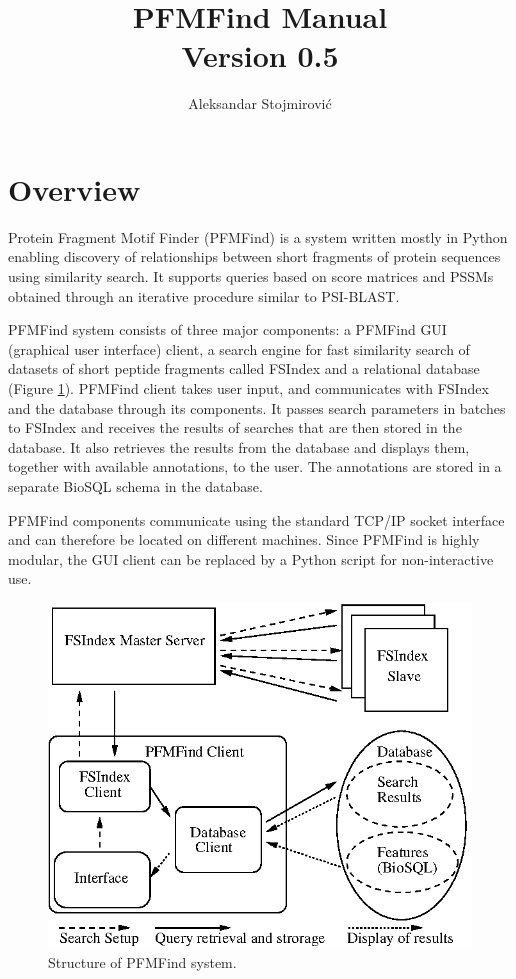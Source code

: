 \documentclass[10pt,letter]{article}
\title{PFMFind Manual\\\textsf{\small Version 0.5}}
\author{Aleksandar Stojmirovi\'c}
\begin{document}
\maketitle
\tableofcontents

\newpage

\section{Overview}
Protein Fragment Motif Finder (PFMFind) is a system written mostly in Python enabling discovery of relationships between short fragments of protein sequences using similarity search. It supports queries based on score matrices and PSSMs obtained through an iterative procedure similar to PSI-BLAST.

PFMFind system consists of three major components: a PFMFind GUI (graphical user interface) client, a search engine for fast similarity search of datasets of short peptide fragments called FSIndex and a relational database (Figure \ref{fig:PFMFind_struct}). PFMFind client takes user input, and communicates with FSIndex and the database through its components. It passes search parameters in batches to FSIndex and receives the results of searches that are then stored in the database. It also retrieves the results from the database and displays them, together with available annotations, to the user. The annotations are stored in a separate BioSQL schema in the database.

PFMFind components communicate using the standard TCP/IP socket interface and can therefore be located on different machines. Since PFMFind is highly modular, the GUI client can be replaced by a Python script for non-interactive use.

\begin{figure}[!tpb]
\centerline{\includegraphics{PFMFind_struct.eps}}
\caption{Structure of PFMFind system.}\label{fig:PFMFind_struct}
\end{figure}
\end{document}
